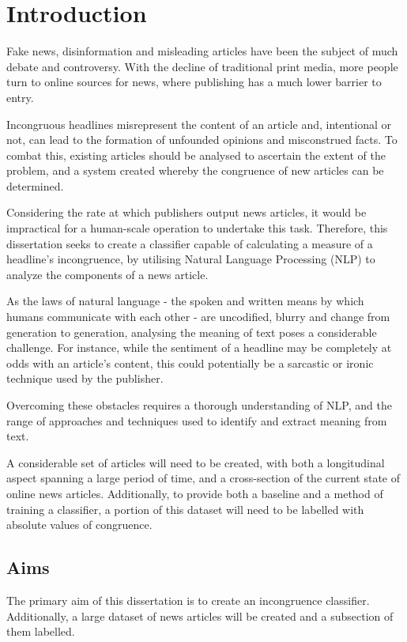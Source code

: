 \section{Introduction}
Fake news, disinformation and misleading articles have been the subject of much debate and controversy. With the decline of traditional print media, more people turn to online sources for news, where publishing has a much lower barrier to entry.

Incongruous headlines misrepresent the content of an article and, intentional or not, can lead to the formation of unfounded opinions and misconstrued facts. To combat this, existing articles should be analysed to ascertain the extent of the problem, and a system created whereby the congruence of new articles can be determined.

Considering the rate at which publishers output news articles, it would be impractical for a human-scale operation to undertake this task. Therefore, this dissertation seeks to create a classifier capable of calculating a measure of a headline's incongruence, by utilising Natural Language Processing (NLP) to analyze the components of a news article.

As the laws of natural language - the spoken and written means by which humans communicate with each other - are uncodified, blurry and change from generation to generation, analysing the meaning of text poses a considerable challenge.  For instance, while the sentiment of a headline may be completely at odds with an article's content, this could potentially be a sarcastic or ironic technique used by the publisher.

Overcoming these obstacles requires a thorough understanding of NLP, and the range of approaches and techniques used to identify and extract meaning from text.

A considerable set of articles will need to be created, with both a longitudinal aspect spanning a large period of time, and a cross-section of the current state of online news articles. Additionally, to provide both a baseline and a method of training a classifier, a portion of this dataset will need to be labelled with absolute values of congruence.


\subsection{Aims}
The primary aim of this dissertation is to create an incongruence classifier. Additionally, a large dataset of news articles will be created and a subsection of them labelled.

